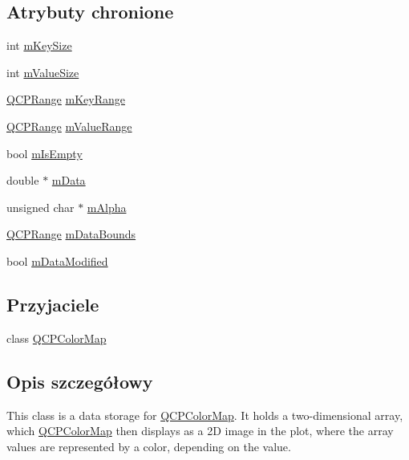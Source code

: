 \subsection*{Atrybuty chronione}
\begin{DoxyCompactItemize}
\item 
int \hyperlink{class_q_c_p_color_map_data_a354e06462023340fbc03894b22499f6d}{m\+Key\+Size}
\item 
int \hyperlink{class_q_c_p_color_map_data_ae8ee9093632a59f55eb4fc06579ed256}{m\+Value\+Size}
\item 
\hyperlink{class_q_c_p_range}{Q\+C\+P\+Range} \hyperlink{class_q_c_p_color_map_data_aaaafd0d7d0f153dbd152f3daf34254ee}{m\+Key\+Range}
\item 
\hyperlink{class_q_c_p_range}{Q\+C\+P\+Range} \hyperlink{class_q_c_p_color_map_data_a225bb96f10c1a27b51ae59249477dbef}{m\+Value\+Range}
\item 
bool \hyperlink{class_q_c_p_color_map_data_a10e91aa89ed05bd177b1f81e07b465b8}{m\+Is\+Empty}
\item 
double $\ast$ \hyperlink{class_q_c_p_color_map_data_ac1682862022f575191351c9825187d39}{m\+Data}
\item 
unsigned char $\ast$ \hyperlink{class_q_c_p_color_map_data_a2146560b3a61a41186f9aa5ed9ec37a6}{m\+Alpha}
\item 
\hyperlink{class_q_c_p_range}{Q\+C\+P\+Range} \hyperlink{class_q_c_p_color_map_data_a1798b3dcc0a27091d196bfd156dcb3f2}{m\+Data\+Bounds}
\item 
bool \hyperlink{class_q_c_p_color_map_data_ad3cc682da2ac14e5acdbc05cf4d3d93b}{m\+Data\+Modified}
\end{DoxyCompactItemize}
\subsection*{Przyjaciele}
\begin{DoxyCompactItemize}
\item 
class \hyperlink{class_q_c_p_color_map_data_afa9d9eab63af3e6f20f882c8d7cc9f20}{Q\+C\+P\+Color\+Map}
\end{DoxyCompactItemize}


\subsection{Opis szczegółowy}
This class is a data storage for \hyperlink{class_q_c_p_color_map}{Q\+C\+P\+Color\+Map}. It holds a two-\/dimensional array, which \hyperlink{class_q_c_p_color_map}{Q\+C\+P\+Color\+Map} then displays as a 2D image in the plot, where the array values are represented by a color, depending on the value.

